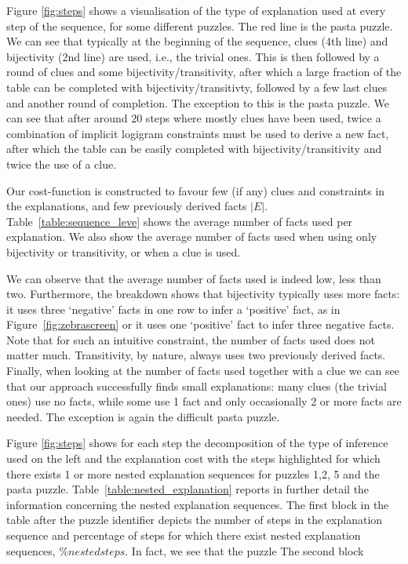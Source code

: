 Figure \ref{fig:steps} shows a visualisation of the type of explanation used at every step of the sequence, for some different puzzles.
The red line is the pasta puzzle.
We can see that typically at the beginning of the sequence, clues (4th line) and bijectivity (2nd line) are used, i.e., the trivial ones.
This is then followed by a round of clues and some bijectivity/transitivity, after which a large fraction of the table can be completed with bijectivity/transitivty, followed by a few last clues and another round of completion.
The exception to this is the pasta puzzle.
We can see that after around 20 steps where mostly clues have been used, twice a combination of implicit logigram constraints must be used to derive a new fact, after which the table can be easily completed with bijectivity/transitivity and twice the use of a clue.


Our cost-function is constructed to favour few (if any) clues and constraints in the explanations, and few previously derived facts $|E|$.
Table~\ref{table:sequence_leve} shows the average number of facts used per explanation. We also show the average number of facts used when using only bijectivity or transitivity, or when a clue is used.

We can observe that the average number of facts used is indeed low, less than two.
Furthermore, the breakdown shows that bijectivity typically uses more facts: it uses three `negative' facts in one row to infer a `positive' fact, as in Figure~\ref{fig:zebrascreen} or it uses one `positive' fact to infer three negative facts.
Note that for such an intuitive constraint, the number of facts used does not matter much.
Transitivity, by nature, always uses two previously derived facts.
Finally, when looking at the number of facts used together with a clue we can see that our approach successfully finds small explanations: many clues (the trivial ones) use no facts, while some use 1 fact and only occasionally 2 or more facts are needed.
The exception is again the difficult pasta puzzle.

Figure \ref{fig:steps} shows for each step the decomposition of the type of inference used on the left and the explanation cost with the steps highlighted for which there exists 1 or more nested explanation sequences for puzzles 1,2, 5 and the pasta puzzle.
Table~\ref{table:nested_explanation} reports in further detail the information concerning the nested explanation sequences. The first block in the table after the puzzle identifier depicts the number of steps in the explanation sequence and percentage of steps for which there exist nested explanation sequences, $\% nested steps$. 
In fact, we see that the puzzle 
The second block 


